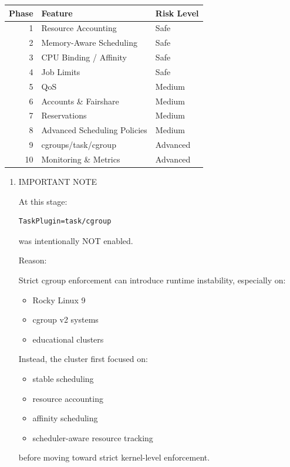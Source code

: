 \documentclass[11pt]{article}
\begin{document}
\begin{center}
\begin{tabular}{rll}
Phase & Feature & Risk Level\\
\hline
1 & Resource Accounting & Safe\\
2 & Memory-Aware Scheduling & Safe\\
3 & CPU Binding / Affinity & Safe\\
4 & Job Limits & Safe\\
5 & QoS & Medium\\
6 & Accounts \& Fairshare & Medium\\
7 & Reservations & Medium\\
8 & Advanced Scheduling Policies & Medium\\
9 & cgroups/task/cgroup & Advanced\\
10 & Monitoring \& Metrics & Advanced\\
\end{tabular}
\end{center}
\begin{enumerate}
\item IMPORTANT NOTE
\label{sec:org6211354}

At this stage:

\begin{verbatim}
TaskPlugin=task/cgroup
\end{verbatim}

was intentionally NOT enabled.

Reason:

Strict cgroup enforcement can introduce runtime instability,
especially on:

\begin{itemize}
\item Rocky Linux 9
\item cgroup v2 systems
\item educational clusters
\end{itemize}

Instead, the cluster first focused on:

\begin{itemize}
\item stable scheduling
\item resource accounting
\item affinity scheduling
\item scheduler-aware resource tracking
\end{itemize}

before moving toward strict kernel-level enforcement.
\end{enumerate}
\end{document}
